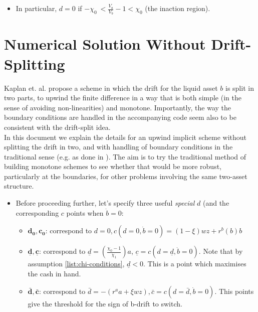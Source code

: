 \documentclass[11pt]{article}
\begin{document}
\begin{itemize}
\item In particular, \(d=0\) if \(-\chi_{0}\ < \frac{V_{a}}{V_{b}}-1 < \chi_0\) (the inaction region).
\end{itemize}


\section{Numerical Solution Without Drift-Splitting}
\label{sec:orgd295c9d}
Kaplan et. al. propose a scheme in which the drift for the liquid asset \(b\) is split in two parts, to upwind the finite difference in a way that is both simple (in the sense of avoiding non-linearities) and monotone. Importantly, the way the boundary conditions are handled in the accompanying code seem also to be consistent with the drift-split idea.\\[0pt]

In this document we explain the details for an upwind implicit scheme without splitting the drift in two, and with handling of boundary conditions in the traditional sense (e.g. as done in \cite{achdou2022income}). The aim is to try the traditional method of building monotone schemes to see whether that would be more robust, particularly at the boundaries, for other problems involving the same two-asset structure.

\begin{itemize}
\item Before proceeding further, let's specify three useful \emph{special} \(d\) (and the corresponding \(c\) points when \(\dot{b}=0\):
\begin{itemize}
\item \(\mathbf{d_0, c_0}\): correspond to \(d=0, c(d=0, \dot{b}=0) = (1-\xi)w z+r^{b}(b)b\)
\item \(\mathbf{\underline{d}, \underline{c}}\): correspond to \(\underline{d} = \left( \frac{\chi_0-1}{\chi_1} \right)a\), \(\underline{c} = c(d=\underline{d}, \dot{b}=0)\). Note that by assumption \ref{list:chi-conditions}, \(\underline{d} < 0\). This is a point which maximises the cash in hand.
\item \(\mathbf{\bar{d}, \bar{c}}\): correspond to \(\bar{d} = -(r^{a}a+\xi w z), \bar{c} = c \left( d=\bar{d}, \dot{b}=0 \right)\). This points give the threshold for the sign of b-drift to switch.
\end{itemize}
\end{itemize}
\end{document}
